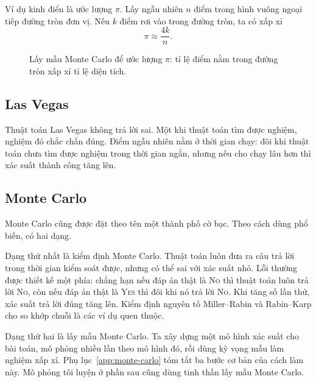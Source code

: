 \documentclass[11pt]{article}
\begin{document}
Ví dụ kinh điển là ước lượng \(\pi\). Lấy ngẫu nhiên \(n\) điểm trong hình
vuông ngoại tiếp đường tròn đơn vị. Nếu \(k\) điểm rơi vào trong đường tròn,
ta có xấp xỉ
\[
  \pi \approx \frac{4k}{n}.
\]

\begin{figure}[htbp]
\centering
{}
\caption{Lấy mẫu Monte Carlo để ước lượng \(\pi\): tỉ lệ điểm nằm trong đường tròn xấp xỉ tỉ lệ diện tích.}
\end{figure}

\subsection{Las Vegas}

Thuật toán Las Vegas không trả lời sai. Một khi thuật toán tìm được nghiệm,
nghiệm đó chắc chắn đúng. Điểm ngẫu nhiên nằm ở thời gian chạy: đôi khi thuật
toán chưa tìm được nghiệm trong thời gian ngắn, nhưng nếu cho chạy lâu hơn thì
xác suất thành công tăng lên.

\subsection{Monte Carlo}

Monte Carlo cũng được đặt theo tên một thành phố cờ bạc. Theo cách dùng phổ
biến, có hai dạng.

Dạng thứ nhất là kiểm định Monte Carlo. Thuật toán luôn đưa ra câu trả lời
trong thời gian kiểm soát được, nhưng có thể sai với xác suất nhỏ. Lỗi thường
được thiết kế một phía: chẳng hạn nếu đáp án thật là \textsc{No} thì thuật toán
luôn trả lời \textsc{No}, còn nếu đáp án thật là \textsc{Yes} thì đôi khi nó
trả lời \textsc{No}. Khi tăng số lần thử, xác suất trả lời đúng tăng lên.
Kiểm định nguyên tố Miller--Rabin và Rabin--Karp cho so khớp chuỗi là các ví
dụ quen thuộc.

Dạng thứ hai là lấy mẫu Monte Carlo. Ta xây dựng một mô hình xác suất cho bài
toán, mô phỏng nhiều lần theo mô hình đó, rồi dùng kỳ vọng mẫu làm nghiệm xấp
xỉ. Phụ lục~\ref{app:monte-carlo} tóm tắt ba bước cơ bản của cách làm này.
Mô phỏng tôi luyện ở phần sau cũng dùng tinh thần lấy mẫu Monte Carlo.
\end{document}
